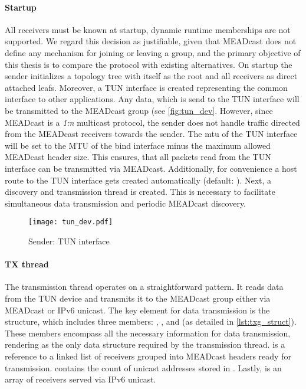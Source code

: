 \paragraph{Startup} %
\label{par:Startup}
All receivers must be known at startup, dynamic runtime memberships are not
    supported.
We regard this decision as justifiable, given that MEADcast does not define any
    mechanism for joining or leaving a group, and the primary objective of this
    thesis is to compare the protocol with existing alternatives.
On startup the sender initializes a topology tree with itself as the root and
    all receivers as direct attached leafs.
Moreover, a TUN interface is created representing the common interface to other
    applications.
Any data, which is send to the TUN interface will be transmitted to the
    MEADcast group (see \autoref{fig:tun_dev}.
However, since MEADcast is a \textit{1:n} multicast protocol, the sender does not
    handle traffic directed from the MEADcast receivers towards the sender.
The \gls{mtu} of the TUN interface will be set to the MTU of the bind interface
    minus the maximum allowed MEADcast header size.
This ensures, that all packets read from the TUN interface can be transmitted
    via MEADcast.
Additionally, for convenience a host route to the TUN interface gets created 
    automatically (default: ).
Next, a discovery and transmission thread is created.
This is necessary to facilitate simultaneous data transmission and periodic
    MEADcast discovery.

\begin{figure}
    \begin{center}
        \texttt{[image: tun\_dev.pdf]}
    \end{center}
    \caption{Sender: TUN interface}
    \label{fig:tun_dev}
\end{figure}

\paragraph{TX thread} %
\label{par:TX thread}
The transmission thread operates on a straightforward pattern.
It reads data from the TUN device and transmits it to the MEADcast group either
    via MEADcast or IPv6 unicast.
The key element for data transmission is the  structure,
    which includes three members: , , and
     (as detailed in \autoref{lst:txg_struct}).
These members encompass all the necessary information for data transmission,
    rendering  as the only data structure required by the
    transmission thread.
 is a reference to a linked list of receivers grouped into
    MEADcast headers ready for transmission.
 contains the count of unicast addresses stored in
    .
Lastly,  is an array of receivers served via IPv6 unicast.

